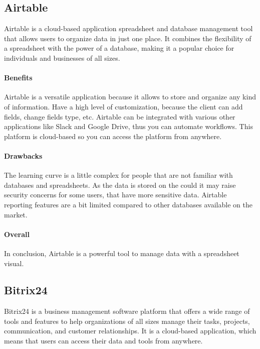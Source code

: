 \documentclass{article}
\begin{document}
\subsection{Airtable}

Airtable is a cloud-based application spreadsheet and database management tool that allows users to organize data in just one place. It combines the flexibility of a spreadsheet with the power of a database, making it a popular choice for individuals and businesses of all sizes.

\paragraph{Benefits}

Airtable is a versatile application because it allows to store and organize any kind of information. Have a high level of customization, because the client can add fields, change fields type, etc. Airtable can be integrated with various other applications like Slack and Google Drive, thus you can automate workflows. This platform is cloud-based so you can access the platform from anywhere.

\paragraph{Drawbacks}

The learning curve is a little complex for people that are not familiar with databases and spreadsheets. As the data is stored on the could it may raise security concerns for some users, that have more sensitive data. Airtable reporting features are a bit limited compared to other databases available on the market.

\paragraph{Overall}

In conclusion, Airtable is a powerful tool to manage data with a spreadsheet visual.

\subsection{Bitrix24}

Bitrix24 is a business management software platform that offers a wide range of tools and features to help organizations of all sizes manage their tasks, projects, communication, and customer relationships. It is a cloud-based application, which means that users can access their data and tools from anywhere.
\end{document}
